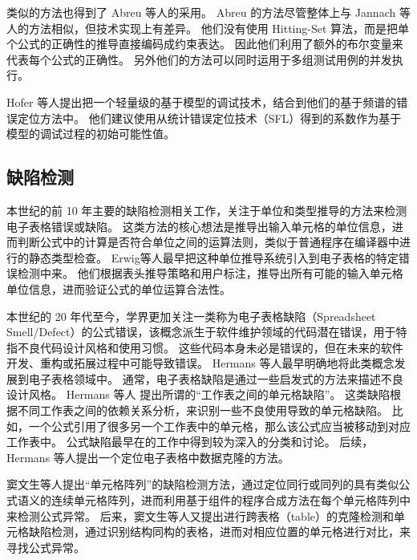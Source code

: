 类似的方法也得到了 Abreu 等人\cite{abreu2012constraint,abreu2012debugging}的采用。
Abreu 的方法尽管整体上与 Jannach 等人的方法相似，但技术实现上有差异。
他们没有使用 Hitting-Set 算法\cite{reiter1987theory}，而是把单个公式的正确性的推导直接编码成约束表达。
因此他们利用了额外的布尔变量来代表每个公式的正确性。
另外他们的方法可以同时运用于多组测试用例的并发执行。

Hofer 等人\cite{hofer2013empirical}提出把一个轻量级的基于模型的调试技术，结合到他们的基于频谱的错误定位方法中。
他们建议使用从统计错误定位技术（SFL）得到的系数作为基于模型的调试过程的初始可能性值。

\subsection{缺陷检测}
本世纪的前 10 年主要的缺陷检测相关工作，关注于单位和类型推导的方法\cite{erwig2002adding,burnett2002testing,ahmad2003type,abraham2004header,abraham2006type,abraham2007ucheck,antoniu2004validating,chambers2009automatic,chambers2010reasoning}来检测电子表格错误或缺陷。
这类方法的核心想法是推导出输入单元格的单位信息，进而判断公式中的计算是否符合单位之间的运算法则，类似于普通程序在编译器中进行的静态类型检查。
Erwig等人\cite{erwig2002adding,abraham2004header}最早把这种单位推导系统引入到电子表格的特定错误检测中来。
他们根据表头推导策略和用户标注，推导出所有可能的输入单元格单位信息，进而验证公式的单位运算合法性。

本世纪的 20 年代至今，学界更加关注一类称为电子表格缺陷（Spreadsheet Smell/Defect）的公式错误，该概念派生于软件维护领域的代码潜在错误\cite{fowler1997refactoring}，用于特指不良代码设计风格和使用习惯。
这些代码本身未必是错误的，但在未来的软件开发、重构或拓展过程中可能导致错误。
Hermans 等人\cite{hermans2012detecting,hermans2012detecting2,hermans2013data}最早明确地将此类概念发展到电子表格领域中。
通常，电子表格缺陷是通过一些启发式的方法来描述不良设计风格。
Hermans 等人\cite{hermans2012detecting} 提出所谓的“工作表之间的单元格缺陷”。
这类缺陷根据不同工作表之间的依赖关系分析，来识别一些不良使用导致的单元格缺陷。
比如，一个公式引用了很多另一个工作表中的单元格，那么该公式应当被移动到对应工作表中。
公式缺陷最早在\cite{hermans2012detecting2}的工作中得到较为深入的分类和讨论。
后续，Hermans 等人\cite{hermans2013data}提出一个定位电子表格中数据克隆的方法。

窦文生等人\cite{dou2014spreadsheet,dou2017cacheck}提出“单元格阵列”的缺陷检测方法，通过定位同行或同列的具有类似公式语义的连续单元格阵列，进而利用基于组件的程序合成方法在每个单元格阵列中来检测公式异常。
后来，窦文生等人\cite{dou2016detecting}又提出进行跨表格（table）的克隆检测和单元格缺陷检测，通过识别结构同构的表格，进而对相应位置的单元格进行对比，来寻找公式异常。

